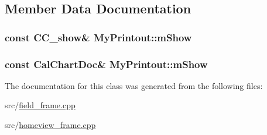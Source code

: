 \subsection{Member Data Documentation}
\hypertarget{a00113_a4c1078528f6d89275e47aa2004e36f13}{
\subsubsection[{m\-Show}]{\setlength{\rightskip}{0pt plus 5cm}const {\bf C\-C\-\_\-show}\& My\-Printout\-::m\-Show}}\label{a00113_a4c1078528f6d89275e47aa2004e36f13}
\hypertarget{a00113_ad117adc488d1299e45c8b15f222a95b5}{
\subsubsection[{m\-Show}]{\setlength{\rightskip}{0pt plus 5cm}const {\bf Cal\-Chart\-Doc}\& My\-Printout\-::m\-Show}}\label{a00113_ad117adc488d1299e45c8b15f222a95b5}


The documentation for this class was generated from the following files\-:\begin{DoxyCompactItemize}
\item 
src/\hyperlink{a00226}{field\-\_\-frame.\-cpp}\item 
src/\hyperlink{a00230}{homeview\-\_\-frame.\-cpp}\end{DoxyCompactItemize}
